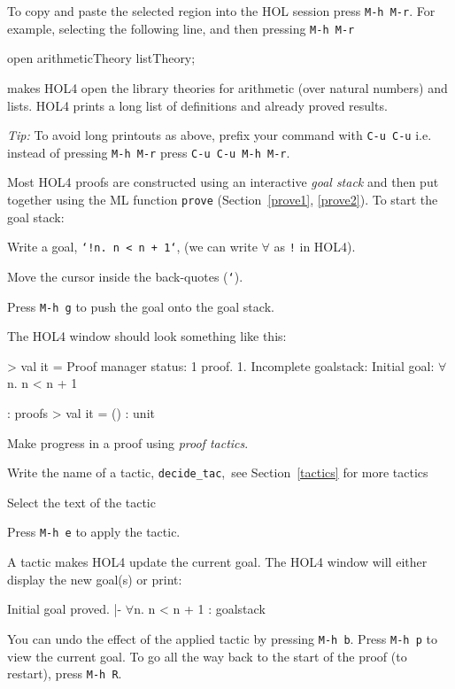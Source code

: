 \documentclass[a4paper,10pt]{article}
\begin{document}
To copy and paste the selected region into the HOL session press {\tt M-h~M-r}.
For example, selecting the following line, and then pressing {\tt M-h M-r}
\begin{code}
open arithmeticTheory listTheory;
\end{code}
makes HOL4 open the library theories for arithmetic (over natural numbers)
and lists. HOL4 prints a long list of definitions and already proved results.

\noindent\rule{0em}{1.5em}\emph{Tip:} To avoid long printouts as above, prefix your command with
{\tt C-u C-u} i.e. instead of pressing {\tt M-h M-r} press
{\tt C-u C-u M-h M-r}.


Most HOL4 proofs are constructed using an interactive \emph{goal
  stack} and then put together using the ML function {\tt prove}
(Section~\ref{prove1}, \ref{prove2}). To start the goal stack:
\begin{enum}
\item Write a goal, \eg{} {\tt `!n{.}~n~<~n~+~1`}, (we can write $\forall$ as {\tt !} in HOL4).
\item Move the cursor inside the back-quotes ({\tt `}).
\item Press {\tt M-h~g} to push the goal onto the goal stack.
\end{enum}
The HOL4 window should look something like this:
\begin{code}
> val it =
     Proof manager status: 1 proof.
  1. Incomplete goalstack:
       Initial goal:
       \(\forall\)n. n < n + 1

   : proofs
> val it = () : unit
\end{code}


Make progress in a proof using \emph{proof tactics}.

\begin{enum}
\item Write the name of a tactic, \eg{} {\tt decide\_tac},~see Section~\ref{tactics} for more tactics
\item Select the text of the tactic
\item Press {\tt M-h~e} to apply the tactic.
\end{enum}
A tactic makes HOL4 update the current goal. The HOL4 window will either
display the new goal(s) or print:
\begin{code}
    Initial goal proved.
    |- \(\forall\)n. n < n + 1 : goalstack
\end{code}
You can undo the effect of the applied tactic by pressing {\tt M-h b}. Press {\tt M-h p} to view the current goal.
To go all the way back to the start of the proof (to restart), press \texttt{M-h~R}.
\end{document}
